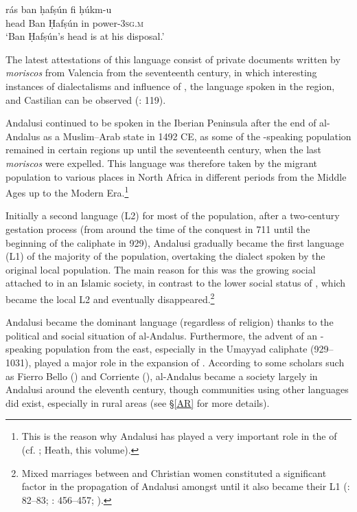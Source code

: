 \documentclass[output=paper,modfonts,nonflat]{langsci/langscibook}
\begin{document}
\ex
\gll rás ban ḥafṣún fi ḥúkm-u \\
head Ban Ḥafṣún in power-\textsc{3sg.m}\\
\glt ‘Ban Ḥafṣún’s head is at his disposal.’
\z
\z

The latest attestations of this language consist of private documents written by \textit{moriscos} from Valencia from the seventeenth century, in which interesting instances of  dialectalisms and influence of , the  language spoken in the region,  and Castilian can be observed (\citealt{BarcelóLabarta2009}: 119).

Andalusi  continued to be spoken in the Iberian Peninsula after the end of al-Andalus as a Muslim–Arab state in 1492 CE, as some of the -speaking population remained in certain regions up until the seventeenth century, when the last \textit{moriscos} were expelled. This language was therefore taken by the migrant population to various places in North Africa in different periods from the Middle Ages up to the Modern Era.\footnote{This is the reason why Andalusi  has played a very important role in the  of   (cf. \citealt{Vicente2010}; Heath, this volume).} 

Initially a second language (L2) for most of the population, after a two-century gestation process (from around the time of the conquest in 711 until the beginning of the caliphate in 929), Andalusi  gradually became the first language (L1) of the majority of the population, overtaking the  dialect spoken by the original local population. The main reason for this was the growing social  attached to  in an Islamic society, in contrast to the lower social status of , which became the local L2 and eventually disappeared.\footnote{Mixed marriages between  and Christian women constituted a significant factor in the propagation of Andalusi  amongst  until it also became their L1 (\citealt{Guichard1989}: 82–83; \citeyear{Guichard1995}: 456–457; \citealt{Chalmeta2003}).}  

Andalusi  became the dominant language (regardless of religion) thanks to the political and social situation of al-Andalus. Furthermore, the advent of an -speaking population from the east, especially in the Umayyad caliphate (929--1031), played a major role in the expansion of . According to some scholars such as Fierro Bello (\citeyear{FierroBello2001}) and Corriente (\citeyear[104]{Corriente2008}), al-Andalus became a society largely  in Andalusi  around the eleventh century, though communities using other languages did exist, especially in rural areas (see §\ref{AR} for more details). 
\end{document}
